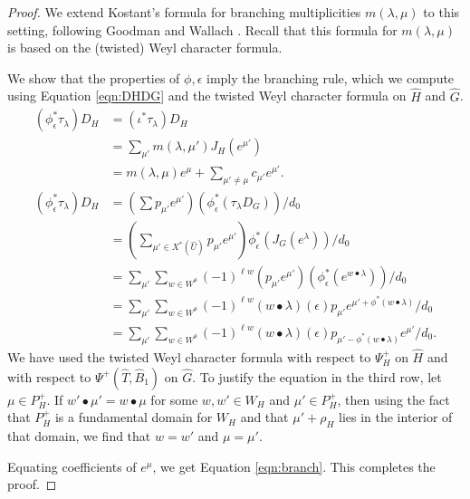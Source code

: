\begin{proof}
  We extend Kostant's formula for branching multiplicities
  $m(\lambda,\mu)$ to this setting, following Goodman and Wallach
  \cite[\S8.2.2]{goodman}.  Recall that this formula for
  $m(\lambda,\mu)$ is based on the (twisted) Weyl character formula.

  We show that the properties of $\phi,\epsilon$ imply the branching
  rule, which we compute using Equation \ref{eqn:DHDG} and
  the twisted Weyl character formula on
  $\hat H$ and $\hat G$. 
\begin{align*}
(\phi^*_\epsilon\tau_\lambda) D_H 
 &= (\iota^*\tau_\lambda) D_H\\
 &= \sum_{\mu'} m(\lambda,{\mu'}) J_H(e^{\mu'})\\
  &= m(\lambda,\mu)e^\mu + \sum_{\mu'\ne\mu} c_{\mu'} e^{\mu'}.\\
(\phi^*_\epsilon\tau_\lambda) D_H 
  &= (\sum p_{\mu'} e^{\mu'})(\phi^*_\epsilon(\tau_\lambda D_{G})) /d_0\\
  &= (\sum_{\mu'\in X^*(\hat U)} p_{\mu'} e^{\mu'}) \phi^*_\epsilon(J_G(e^\lambda)) /d_0\\
  &= \sum_{\mu'} \sum_{w\in W^\theta} (-1)^{\ell w} 
  (p_{\mu'} e^{\mu'}) (\phi^*_\epsilon (e^{w\bullet \lambda})) /d_0\\
  &= \sum_{\mu'} \sum_{w\in W^\theta} (-1)^{\ell w}  
 ({w\bullet\lambda})(\epsilon) p_{\mu'}
e^{\mu'+\phi^*(w\bullet \lambda)} /d_0\\
  &= \sum_{\mu'} \sum_{w\in W^\theta} 
(-1)^{\ell w} ({w\bullet\lambda})(\epsilon) 
 p_{\mu' - \phi^*({w\bullet \lambda})} e^{\mu'} /d_0.
\end{align*}
We have used the twisted Weyl character formula with respect to $\Psi^+_H$ on $\hat H$
and with respect to $\Psi^+(\hat T,\hat B_1)$  on $\hat G$.
To justify the equation in the third row, let $\mu\in P_H^+$.  If
$w'\bullet \mu' = w\bullet \mu$ for some $w,w'\in W_H$ and $\mu'\in
P_H^+$, then using the fact that $P_H^+$ is a fundamental domain for
$W_H$ and that $\mu'+\rho_H$ lies in the interior of that domain, we
find that $w=w'$ and $\mu=\mu'$.

Equating coefficients of $e^\mu$, we get Equation \ref{eqn:branch}.
This completes the proof.
\end{proof}



